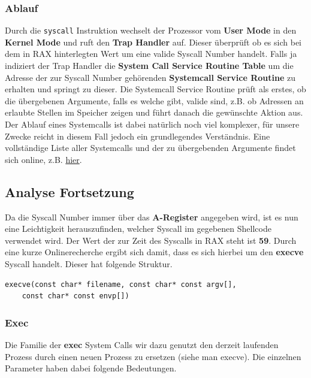 \documentclass[12pt]{article}
\begin{document}
\subsubsection*{Ablauf}
Durch die \texttt{syscall} Instruktion wechselt der Prozessor vom \textbf{User Mode} in den \textbf{Kernel Mode} und ruft den \textbf{Trap Handler} auf. Dieser überprüft ob es sich bei dem in RAX hinterlegten Wert um eine valide Syscall Number handelt. Falls ja indiziert der Trap Handler die \textbf{System Call Service Routine Table} um die Adresse der zur Syscall Number gehörenden \textbf{Systemcall Service Routine} zu erhalten und springt zu dieser.
\newline
\newline
Die Systemcall Service Routine prüft als erstes, ob die übergebenen Argumente, falls es welche gibt, valide sind, z.B. ob Adressen an erlaubte Stellen im Speicher zeigen und führt danach die gewünschte Aktion aus. Der Ablauf eines Systemcalls ist dabei natürlich noch viel komplexer, für unsere Zwecke reicht in diesem Fall jedoch ein grundlegendes Verständnis.
\newline
\newline
Eine vollständige Liste aller Systemcalls und der zu übergebenden Argumente findet sich online, z.B. \href{https://blog.rchapman.org/posts/Linux_System_Call_Table_for_x86_64/}{hier}.


\subsection{Analyse Fortsetzung}
Da die Syscall Number immer über das \textbf{A-Register} angegeben wird, ist es nun eine Leichtigkeit herauszufinden, welcher Syscall im gegebenen Shellcode verwendet wird. Der Wert der zur Zeit des Syscalls in RAX steht ist \textbf{59}. Durch eine kurze Onlinerecherche ergibt sich damit, dass es sich hierbei um den \textbf{execve} Syscall handelt. Dieser hat folgende Struktur.
\begin{lstlisting}
execve(const char* filename, const char* const argv[], 
    const char* const envp[])
\end{lstlisting}

\subsubsection{Exec}
Die Familie der \textbf{exec} System Calls wir dazu genutzt den derzeit laufenden Prozess durch einen neuen Prozess zu ersetzen (siehe man execve). Die einzelnen Parameter haben dabei folgende Bedeutungen.
\end{document}
